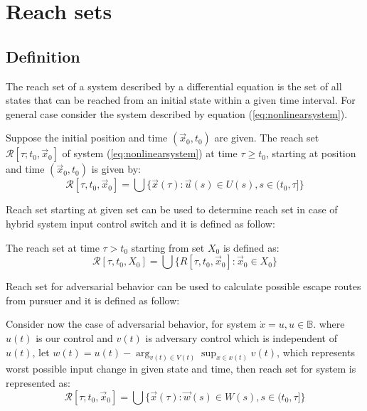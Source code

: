 \section{Reach sets}

\subsection*{Definition}
\noindent
The reach set of a system described by a differential equation is the
set of all states that can be reached from an initial state within a given time
interval.
\noindent For general case consider the system described by equation (\ref{eq:nonlinearsystem}).

\begin{definition}\label{def:reachset01}
Suppose the initial position
and time $(\vec{x}_0, t_0)$ are given. The reach set $\mathscr{R}[\tau; t_0, \vec{x}_0]$ of system (\ref{eq:nonlinearsystem}) at time $\tau \ge t_0$, starting at position and time $(\vec{x}_0, t_0)$ is given by:
\begin{equation}
    \mathscr{R}[\tau, t_0, \vec{x}_0] = \bigcup \{\vec{x}(\tau):\vec{u}(s)\in U(s),s \in (t_0,\tau]\}
\end{equation}
\end{definition}
\noindent Reach set starting at given set can be used to determine reach set in case of hybrid system input control switch and it is defined as follow:
\begin{definition}
The reach set at time $\tau > t_0$ starting from set $X_0$ is defined as:
\begin{equation}
    \mathscr{R}[\tau, t_0, X_0] = \bigcup \{R[\tau, t_0, \vec{x}_0]:\vec{x}_0 \in X_0\}
\end{equation}
\end{definition}

\noindent Reach set for adversarial behavior can be used to calculate possible escape routes from pursuer and it is defined as follow:
\begin{definition}
Consider now the case of adversarial behavior, for system $\dot{x}=u,u\in \mathbb{B}$.
where $u(t)$ is our control and $v(t)$ is adversary control which is independent of $u(t)$, let $w(t)=u(t)- \arg_{v(t)\in V(t)}\sup_{{x} \in x(t)} v(t)$, which represents worst possible input change in given state and time, then reach set for system is represented as:
\begin{equation}
    \mathscr{R}[\tau; t_0, \vec{x}_0] = \bigcup \{\vec{x}(\tau):\vec{w}(s) \in W(s),s \in (t_0,\tau]\}
\end{equation}

\end{definition}

